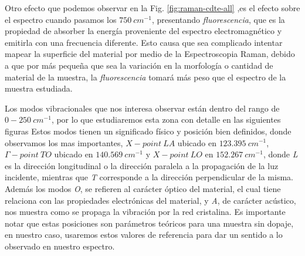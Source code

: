 Otro efecto que podemos observar en la Fig. \ref{fig:raman-cdte-all} ,es el efecto sobre el espectro cuando pasamos los $750\ cm^{-1}$, presentando \textit{fluorescencia}, que es la propiedad de absorber la energía proveniente del espectro electromagnético y emitirla con una frecuencia diferente. Esto causa que sea complicado intentar mapear la superficie del material por medio de la Espectroscopia Raman, debido a que por más pequeña que sea la variación en la morfología o cantidad de material de la muestra, la \textit{fluorescencia} tomará más peso que el espectro de la muestra estudiada.

Los modos vibracionales que nos interesa observar están dentro del rango de $ 0-250\ cm^{-1}$, por lo que estudiaremos esta zona con detalle en las siguientes figuras Estos modos tienen un significado físico y posición bien definidos, donde observamos los mas importantes, $X-point\ LA$ ubicado en $123.395\ cm^{-1}$, $\Gamma-point\ TO$ ubicado en $140.569\ cm^{-1}$ y $X-point\ LO$ en $152.267\ cm^{-1}$, donde \textit{L} es la dirección longitudinal o la dirección paralela a la propagación de la luz incidente, mientras que \textit{T} corresponde a la dirección perpendicular de la misma. Además los modos \textit{O}, se refieren al carácter óptico del material, el cual tiene relaciona con las propiedades electrónicas del material, y \textit{A}, de carácter acústico, nos muestra como se propaga la vibración por la red cristalina\cite{Nassar2016}. Es importante notar que estas posiciones son parámetros teóricos para una muestra sin dopaje, en nuestro caso, usaremos estos valores de referencia para dar un sentido a lo observado en nuestro espectro.

